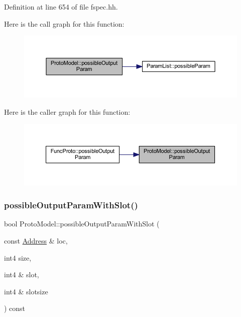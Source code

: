 Definition at line 654 of file fspec.\+hh.

Here is the call graph for this function\+:
\nopagebreak
\begin{figure}[H]
\begin{center}
\leavevmode
\includegraphics[width=350pt]{class_proto_model_aea2696911b81cc71cc68d927d7c02204_cgraph}
\end{center}
\end{figure}
Here is the caller graph for this function\+:
\nopagebreak
\begin{figure}[H]
\begin{center}
\leavevmode
\includegraphics[width=350pt]{class_proto_model_aea2696911b81cc71cc68d927d7c02204_icgraph}
\end{center}
\end{figure}
\mbox{\label{class_proto_model_afd3283c9f718ce1e521186810f48ce6f}} 
\subsubsection{\texorpdfstring{possibleOutputParamWithSlot()}{possibleOutputParamWithSlot()}}
{\footnotesize\ttfamily bool Proto\+Model\+::possible\+Output\+Param\+With\+Slot (\begin{DoxyParamCaption}\item[{const \mbox{\hyperlink{class_address}{Address}} \&}]{loc,  }\item[{int4}]{size,  }\item[{int4 \&}]{slot,  }\item[{int4 \&}]{slotsize }\end{DoxyParamCaption}) const\hspace{0.3cm}{\ttfamily [inline]}}



